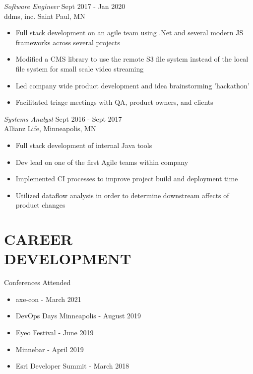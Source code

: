 \documentclass[margin]{res}
\begin{document}
\begin{resume}
\begin{itemize}
				\end{itemize}

			  {\sl Software Engineer} \hfill Sept 2017 - Jan 2020 \\
                ddms, inc.
                Saint Paul, MN
                \begin{itemize}  \itemsep -2pt %
                \item Full stack development on an agile team using .Net and several modern JS frameworks across several projects
                \item Modified a CMS library to use the remote S3 file system instead of the local file system for small scale video streaming
                \item Led company wide product development and idea brainstorming 'hackathon'
                \item Facilitated triage meetings with QA, product owners, and clients
                \end{itemize}

                {\sl Systems Analyst} \hfill Sept 2016 - Sept 2017 \\
                Allianz Life,
                Minneapolis, MN
                \begin{itemize}  \itemsep -2pt %
                \item Full stack development of internal Java tools
                \item Dev lead on one of the first Agile teams within company
                \item Implemented CI processes to improve project build and deployment time
                \item Utilized dataflow analysis in order to determine downstream affects of product changes
                \end{itemize}


\section{CAREER \\ DEVELOPMENT}
                Conferences Attended
                \begin{itemize} \itemsep -2pt
              \item axe-con - March 2021
			  \item DevOps Days Minneapolis - August 2019
			  \item Eyeo Festival - June 2019
			  \item Minnebar - April 2019
                \item Esri Developer Summit - March 2018
                \end{itemize}

\end{resume}
\end{document}
